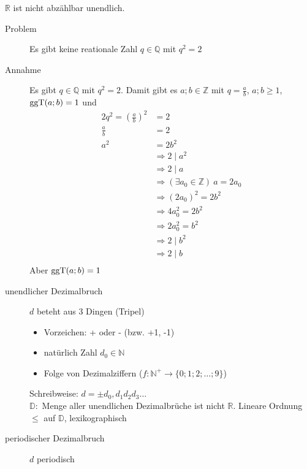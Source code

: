 $\mathbb{R}$ ist nicht abzählbar unendlich.
\begin{description}
    \item[Problem] Es gibt keine reationale Zahl $q \in \mathbb{Q}$ mit $q^2 = 2$
    \item[Annahme] Es gibt $q \in \mathbb{Q}$ mit $q^2 = 2$. Damit gibt es $a;b \in \mathbb{Z}$ mit $q = \frac{a}{b}$, $a;b \geq 1$, $\operatorname{ggT}(a;b) = 1$ und
    \begin{alignat*}{2}
        q^2 = \left( \frac{a}{b}\right)^2 & = 2                                                \\
        \frac{a}{b}                       & = 2                                                \\
        a^2                               & = 2b^2                                             \\
        & \Rightarrow 2 \mid a^2                             \\
        & \Rightarrow 2 \mid a                               \\
        & \Rightarrow (\exists a_0 \in \mathbb{Z})\ a = 2a_0 \\
        & \Rightarrow \left(2a_0\right)^2 = 2b^2             \\
        & \Rightarrow 4a_0^2 = 2b^2                          \\
        & \Rightarrow 2a_0^2 = b^2                           \\
        & \Rightarrow 2 \mid b^2                             \\
        & \Rightarrow 2 \mid b                               \\
    \end{alignat*}
    Aber $\operatorname{ggT}(a;b) = 1$
    \item[unendlicher Dezimalbruch] $d$ beteht aus 3 Dingen (Tripel)
    \begin{itemize}
        \item Vorzeichen: + oder - (bzw. +1, -1)
        \item natürlich Zahl $d_0 \in \mathbb{N}$
        \item Folge von Dezimalziffern ($f : \mathbb{N}^+ \longrightarrow \lbrace 0; 1; 2; \dots ; 9 \rbrace$)
    \end{itemize}
    Schreibweise: $d = \pm d_0,d_1 d_2 d_3\dots$\\
    $\mathbb{D} :$ Menge aller unendlichen Dezimalbrüche ist nicht $\mathbb{R}$. Lineare Ordnung $\leq$ auf $\mathbb{D}$, lexikographisch
    \item[periodischer Dezimalbruch] $d$ periodisch

\end{description}
